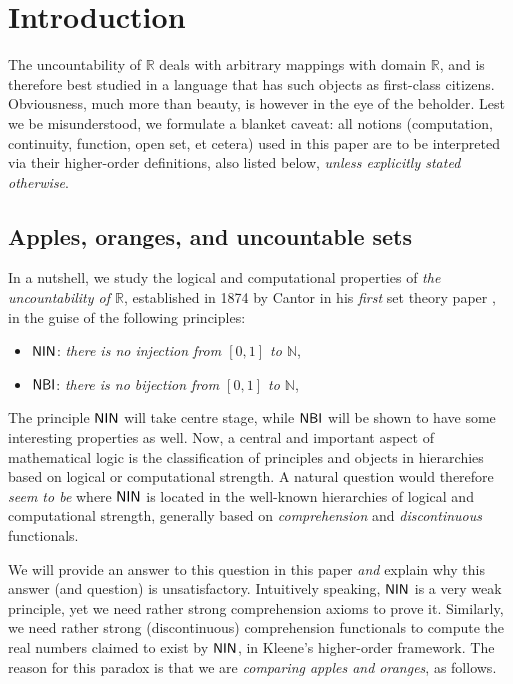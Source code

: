 \documentclass[reqno]{amsart}
\def\N{{\mathbb  N}}
\def\R{{\mathbb  R}}
\def\NBI{\textup{\textsf{NBI}}}
\def\NIN{\textup{\textsf{NIN}}}
\numberwithin{equation}{section}
\numberwithin{thm}{section}
\begin{document}
\vspace{-8mm}
\section{Introduction}\label{intro}
The uncountability of $\R$ deals with arbitrary mappings with domain $\R$, and is therefore best studied in a language that has such objects as first-class citizens. 
Obviousness, much more than beauty, is however in the eye of the beholder.  Lest we be misunderstood, we formulate a blanket caveat: all notions (computation, continuity, function, open set, et cetera) used in this paper are to be interpreted via their higher-order definitions, also listed below, \emph{unless explicitly stated otherwise}.    
\subsection{Apples, oranges, and uncountable sets}\label{apples}
In a nutshell, we study the logical and computational properties of \emph{the uncountability of $\R$}, established in 1874 by Cantor in his \emph{first} set theory paper \cite{cantor1}, in the guise of the following principles:
\begin{itemize}
\item $\NIN$: \emph{there is no injection from $[0,1]$ to $\N$},
\item  $\NBI$: \emph{there is no bijection from $[0,1]$ to $\N$},
\end{itemize}
The principle $\NIN$ will take centre stage, while $\NBI$ will be shown to have some interesting properties as well. 
Now, a central and important aspect of mathematical logic is the classification of principles and objects in hierarchies based on logical or computational strength. 
A natural question would therefore \emph{seem to be} where $\NIN$ is located in the well-known hierarchies of logical and computational strength, generally based on \emph{comprehension} and \emph{discontinuous} functionals.  

\smallskip

We will provide an answer to this question in this paper \emph{and} explain why this answer (and question) is unsatisfactory.  
Intuitively speaking, $\NIN$ is a very weak principle, yet we need rather strong comprehension axioms to prove it.  
Similarly, we need rather strong (discontinuous) comprehension functionals to compute the real numbers claimed to exist by $\NIN$, in Kleene's higher-order framework.   
The reason for this paradox is that we are \emph{comparing apples and oranges}, as follows. 
\end{document}
